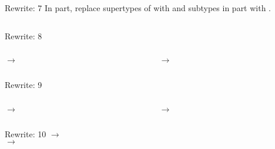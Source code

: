 \begin{frame}{Rewrite: 7}
  In  part, replace supertypes of  with  and subtypes in  part with .

  \begin{columns}
    \begin{column}{0.5\textwidth}
      \usebox\typecaseGbox
    \end{column}
    \begin{column}{0.5\textwidth}  %
      \usebox\typecaseHbox
    \end{column}    
  \end{columns}
\end{frame}


\begin{frame}{Rewrite: 8}

  \begin{columns}
    \begin{column}{0.5\textwidth}
       $\to$ 
      \usebox\typecaseHbox
    \end{column}
    \begin{column}{0.5\textwidth}  %
       $\to$ 
      \usebox\typecaseIbox
    \end{column}    
  \end{columns}
\end{frame}

\begin{frame}{Rewrite: 9}

  \begin{columns}
    \begin{column}{0.5\textwidth}
       $\to$ 
      \usebox\typecaseIbox
    \end{column}
    \begin{column}{0.5\textwidth}  %
       $\to$ 
      \usebox\typecaseJbox
    \end{column}    
  \end{columns}
\end{frame}

\begin{frame}{Rewrite: 10}
   $\to$ \\
   $\to$ 

  \begin{columns}
    \begin{column}{0.5\textwidth}
      \usebox\typecaseJbox
    \end{column}
    \begin{column}{0.5\textwidth}  %
      \usebox\typecaseKbox
    \end{column}
  \end{columns}
\end{frame}


